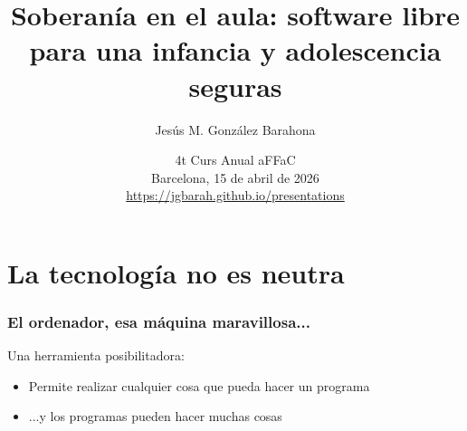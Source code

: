 \documentclass[17pt,aspectratio=169]{beamer}
\renewcommand{\secimage}{figs/bookpages}
\newcommand{\secimage}{figs/bookpages}
\begin{document}
\title{Soberanía en el aula: software libre para una infancia y adolescencia seguras}
\author{Jesús M. González Barahona}

\date{4t Curs Anual aFFaC \\
  Barcelona, 15 de abril de 2026 \\
{\small \url{https://jgbarah.github.io/presentations}} \\}

\frame{
\maketitle
}





\renewcommand{\secimage}{figs/ordenador-bebe}


\section{La tecnología no es neutra}



\begin{frame}
\frametitle{El ordenador, esa máquina maravillosa...}

Una herramienta posibilitadora:

\begin{itemize}
\item Permite realizar cualquier cosa que pueda hacer un programa
\item ...y los programas pueden hacer muchas cosas
\end{itemize}


\end{frame}
\end{document}
